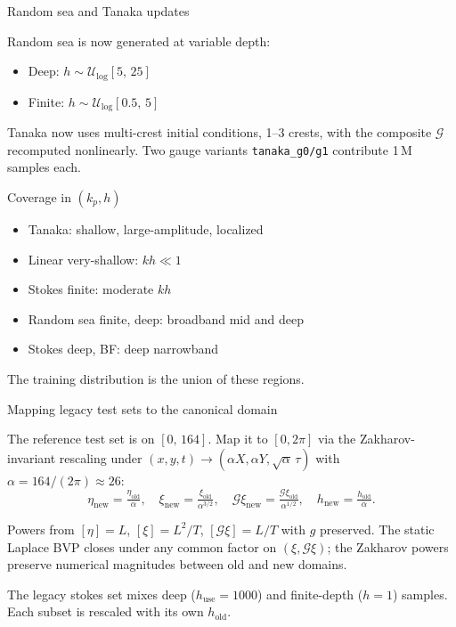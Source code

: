 \documentclass[aspectratio=169,11pt]{beamer}
\newcommand{\Gop}{\mathcal{G}}
\begin{document}
\begin{frame}{Random sea and Tanaka updates}

Random sea is now generated at variable depth:
\begin{itemize}
  \item Deep: $h \sim \mathcal{U}_{\log}[5,\,25]$
  \item Finite: $h \sim \mathcal{U}_{\log}[0.5,\,5]$
\end{itemize}

\pause
Tanaka now uses multi-crest initial conditions, 1--3 crests, with the
composite $\Gop$ recomputed nonlinearly. Two gauge variants
\texttt{tanaka\_g0/g1} contribute 1\,M samples each.
\end{frame}

\begin{frame}{Coverage in $(k_p, h)$}

\begin{itemize}
  \item Tanaka: shallow, large-amplitude, localized
  \item Linear very-shallow: $kh \ll 1$
  \item Stokes finite: moderate $kh$
  \item Random sea finite, deep: broadband mid and deep
  \item Stokes deep, BF: deep narrowband
\end{itemize}

\pause
The training distribution is the union of these regions.
\end{frame}

\begin{frame}{Mapping legacy test sets to the canonical domain}

The reference test set is on $[0,\,164]$. Map it to $[0, 2\pi]$ via the
Zakharov-invariant rescaling under $(x, y, t) \to (\alpha X, \alpha Y, \sqrt\alpha\,\tau)$
with $\alpha = 164 / (2\pi) \approx 26$:
\[
  \eta_{\text{new}} = \tfrac{\eta_{\text{old}}}{\alpha}, \quad
  \xi_{\text{new}}  = \tfrac{\xi_{\text{old}}}{\alpha^{3/2}}, \quad
  \Gop\xi_{\text{new}} = \tfrac{\Gop\xi_{\text{old}}}{\alpha^{1/2}}, \quad
  h_{\text{new}}    = \tfrac{h_{\text{old}}}{\alpha}.
\]

\pause
Powers from $[\eta]=L$, $[\xi]=L^2/T$, $[\Gop\xi]=L/T$ with $g$ preserved.
The static Laplace BVP closes under any common factor on $(\xi, \Gop\xi)$;
the Zakharov powers preserve numerical magnitudes between old and new domains.

\pause
The legacy stokes set mixes deep ($h_{\text{use}} = 1000$) and
finite-depth ($h = 1$) samples. Each subset is rescaled with its own
$h_{\text{old}}$.
\end{frame}
\end{document}
